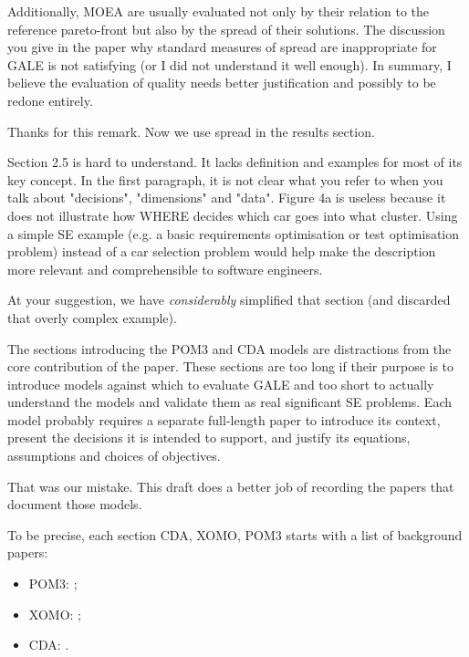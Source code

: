 \documentclass[10pt,journal,compsoc]{IEEEtran}
\newcommand{\bi}{\begin{itemize}}
\newcommand{\ei}{\end{itemize}}
\newenvironment{changed}{\par\color{MyDarkBlue}}{\par}
\begin{document}
Additionally, MOEA are usually evaluated not only
by their relation to the reference pareto-front but
also by the spread of their solutions. The
discussion you give in the paper why standard
measures of spread are inappropriate for GALE is not
satisfying (or I did not understand it well enough).
In summary, I believe the evaluation of quality
needs better justification and possibly to be redone
entirely.

\begin{changed}
Thanks for this remark. Now we use spread in the results section.
\end{changed}



Section 2.5 is hard to understand. It lacks
definition and examples for most of its key
concept. In the first paragraph, it is not clear
what you refer to when you talk about "decisions",
"dimensions" and "data". Figure 4a is useless
because it does not illustrate how WHERE decides
which car goes into what cluster. Using a simple SE
example (e.g. a basic requirements optimisation or
test optimisation problem) instead of a car
selection problem would help make the description
more relevant and comprehensible to software
engineers.


\begin{changed}
At your suggestion, we have {\em considerably} simplified that section (and discarded that
overly complex example).
\end{changed}

The sections introducing the POM3 and CDA models are
distractions from the core contribution of the
paper. These sections are too long if their purpose
is to introduce models against which to evaluate
GALE and too short to actually understand the models
and validate them as real significant SE
problems. Each model probably requires a separate
full-length paper to introduce its context, present
the decisions it is intended to support, and justify
its equations, assumptions and choices of
objectives.

\begin{changed}
That was our mistake. This draft does a better job of 
recording the papers that document those models. 

To be precise, each section CDA, XOMO, POM3 starts with a list
of background papers:

\bi
\item POM3: \cite{port08,me09j,1204376,turner03};
\item XOMO: \cite{me07f,me09a,me09e};
\item CDA:  \cite{Kim2011,Pritchett2011,Feigh2012,Kim2013,Pritchett2013}.
\ei
\end{changed}
\end{document}
